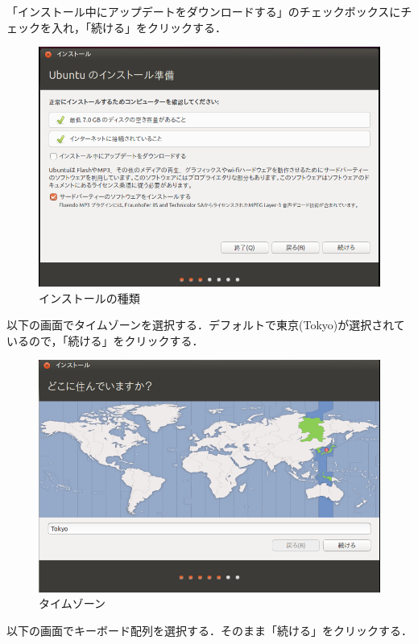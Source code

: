 \clearpage
「インストール中にアップデートをダウンロードする」のチェックボックスにチェックを入れ，「続ける」をクリックする．
\begin{figure}[htb]
\centering
\includegraphics[width=15cm]{ubuntuinstall1.png}
\caption{インストールの種類}\label{インストール準備画面2}
\end{figure}
\clearpage
以下の画面でタイムゾーンを選択する．デフォルトで東京(Tokyo)が選択されているので，「続ける」をクリックする．

\begin{figure}[htb]
\centering
\includegraphics[width=15cm]{ubuntuinstall4.png}
\caption{タイムゾーン}\label{タイムゾーン}
\end{figure}
\clearpage

以下の画面でキーボード配列を選択する．そのまま「続ける」をクリックする．

